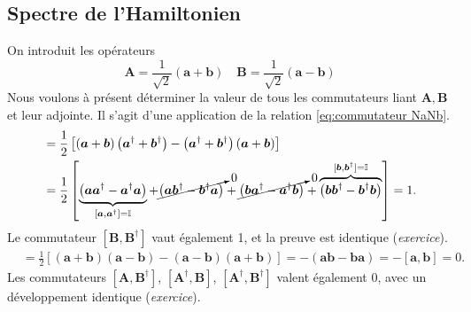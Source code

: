 \documentclass[11pt,oneside,a4paper]{article}
\begin{document}
\subsection{Spectre de l'Hamiltonien}
On introduit les opérateurs 
\begin{equation*}
  \bm{A} = \frac{1}{\sqrt{2}}\left(\bm{a}+\bm{b}\right) \quad \bm{B} = \frac{1}{\sqrt{2}}\left(\bm{a}-\bm{b}\right)
\end{equation*}
Nous voulons à présent déterminer la valeur de tous les commutateurs liant $\bm{A},\bm{B}$ et leur adjointe. Il s'agit d'une application de la relation \eqref{eq:commutateur NaNb}.
\begin{align*}
  [\bm{A},\bm{A}^\dagger] &= \frac{1}{2}\left[\left(\bm{a}+\bm{b}\right)\left(\bm{a}^\dagger+\bm{b}^\dagger\right)-\left(\bm{a}^\dagger+\bm{b}^\dagger\right)\left(\bm{a}+\bm{b}\right)\right]\\
  &= \frac{1}{2}\left[\underbrace{\left(\bm{a}\bm{a}^\dagger-\bm{a}^\dagger\bm{a}\right)}_{[\bm{a},\bm{a}^\dagger] = \mathbb{I}}+\cancelto{0}{\left(\bm{a}\bm{b}^\dagger-\bm{b}^\dagger\bm{a}\right)}+\cancelto{0}{\left(\bm{b}\bm{a}^\dagger-\bm{a}^\dagger\bm{b}\right)}+\overbrace{\left(\bm{b}\bm{b}^\dagger-\bm{b}^\dagger\bm{b}\right)}^{[\bm{b},\bm{b}^\dagger] = \mathbb{I}}\right] = 1.
\end{align*}
Le commutateur $[\bm{B},\bm{B}^\dagger]$ vaut également 1, et la preuve est identique (\emph{exercice}).
\begin{align*}
  [\bm{A},\bm{B}] &= \frac{1}{2}\left[\left(\bm{a}+\bm{b}\right)\left(\bm{a}-\bm{b}\right)-\left(\bm{a}-\bm{b}\right)\left(\bm{a}+\bm{b}\right)\right] = -\left(\bm{a}\bm{b}-\bm{b}\bm{a}\right) = -\left[\bm{a},\bm{b}\right] = 0.
\end{align*}
Les commutateurs $[\bm{A},\bm{B}^\dagger]$, $[\bm{A}^\dagger,\bm{B}]$, $[\bm{A}^\dagger,\bm{B}^\dagger]$ valent également 0, avec un développement identique (\emph{exercice}).
\end{document}
